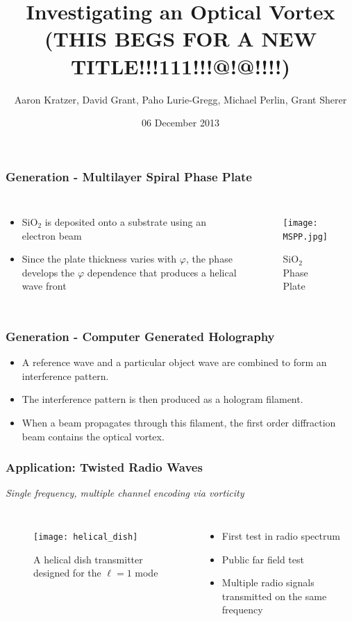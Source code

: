 \documentclass[xcolor=dvipsnames]{beamer}
\title{Investigating an Optical Vortex (THIS BEGS FOR A NEW TITLE!!!111!!!@!@!!!!)}
\author{Aaron Kratzer, David Grant, Paho Lurie-Gregg,
  Michael Perlin, Grant Sherer}
\date{06 December 2013}
\newenvironment{items}[1][]
{\begin{itemize}
    \ifthenelse{\isempty{#1}}
    {\setlength{\itemsep}{12pt}}{\setlength{\itemsep}{#1}}}
  {\end{itemize}}
\renewcommand{\phi}{\varphi} %
\begin{document}
\begin{frame}
  \maketitle
\end{frame}

\begin{frame}
	\frametitle{Generation - Multilayer Spiral Phase Plate}
  \begin{columns}[c]
    \begin{items}
    \item SiO$_2$ is deposited onto a substrate using an electron beam
    \item Since the plate thickness varies with $\phi$, the phase
      develops the $\phi$ dependence that produces a helical wave
      front
    \end{items}
    \begin{figure}
      \texttt{[image: MSPP.jpg]}
      \caption{SiO$_2$ Phase Plate}
      \label{MSPP}
    \end{figure}
  \end{columns}
\end{frame}

\begin{frame}
	\frametitle{Generation - Computer Generated Holography}
  \begin{items}
  \item A reference wave and a particular object wave are combined to
    form an interference pattern.
  \item The interference pattern is then produced as a hologram
    filament.
  \item When a beam propagates through this filament, the first order
    diffraction beam contains the optical vortex.
  \end{items}
\end{frame}

\begin{frame}
	\frametitle{Application: Twisted Radio Waves}
	\begin{center}
		\emph{Single frequency, multiple channel encoding via vorticity}
	\end{center}
  \begin{columns}[c]
    \begin{figure}
      \texttt{[image: helical\_dish]}
      \caption{A helical dish transmitter designed for the $\ell=1$
        mode}
      \label{pic:dish}
    \end{figure}
		\begin{items}
		\item First test in radio spectrum
		\item Public far field test
		\item Multiple radio signals transmitted on the same frequency
		\end{items}
	\end{columns}
\end{frame}
\end{document}
